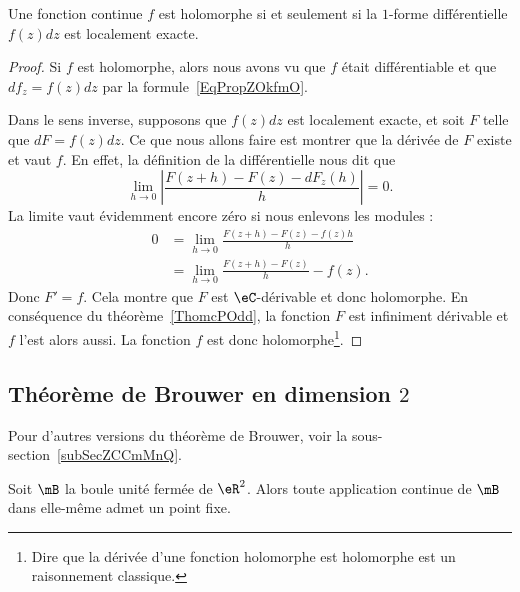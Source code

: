\begin{proposition}\label{PropZOkfmO}
	Une fonction continue \( f\) est holomorphe si et seulement si la \( 1\)-forme différentielle \( f(z)dz\) est localement exacte.
\end{proposition}

\begin{proof}
	Si \( f\) est holomorphe, alors nous avons vu que \( f\) était différentiable et que \( df_{z}=f(z)dz\) par la formule~\ref{EqPropZOkfmO}.

	Dans le sens inverse, supposons que \( f(z)dz\) est localement exacte, et soit \( F\) telle que \( dF=f(z)dz\). Ce que nous allons faire est montrer que la dérivée de \( F\) existe et vaut \( f\). En effet, la définition de la différentielle nous dit que
	\begin{equation}
		\lim_{h\to 0} \left| \frac{ F(z+h)-F(z)-dF_z(h) }{ h } \right| =0.
	\end{equation}
	La limite vaut évidemment encore zéro si nous enlevons les modules :
	\begin{subequations}
		\begin{align}
			0 & =\lim_{h\to 0} \frac{ F(z+h)-F(z)-f(z)h }{ h } \\
			  & =\lim_{h\to 0} \frac{ F(z+h)-F(z) }{ h }-f(z).
		\end{align}
	\end{subequations}
	Donc \( F'=f\). Cela montre que \( F\) est \( \eC\)-dérivable et donc holomorphe. En conséquence du théorème~\ref{ThomcPOdd}, la fonction \( F\) est infiniment dérivable et \( f\) l'est alors aussi. La fonction \( f\) est donc holomorphe\footnote{Dire que la dérivée d'une fonction holomorphe est holomorphe est un raisonnement classique.}.
\end{proof}

\subsection{Théorème de Brouwer en dimension \texorpdfstring{$ 2$}{2}}
Pour d'autres versions du théorème de Brouwer, voir la sous-section~\ref{subSecZCCmMnQ}.

\begin{theorem}     \label{ThoLVViheK}
	Soit \( \mB\) la boule unité fermée de \( \eR^2\). Alors toute application continue de \( \mB\) dans elle-même admet un point fixe.
\end{theorem}

